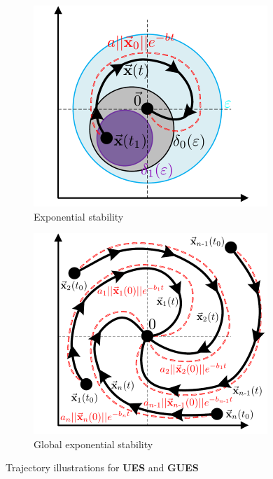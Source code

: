 \begin{figure}[hbtp]
\centering
\begin{subfigure}{0.49\textwidth}
\includegraphics[width=\textwidth]{figs/exponential-stability}
\vspace{-14pt}
\caption{Exponential stability}
\label{fig:exponential-stability}
\end{subfigure}
\begin{subfigure}{0.49\textwidth}
\centering
\includegraphics[width=\textwidth]{figs/global-exponential-stability}
\vspace{-14pt}
\caption{Global exponential stability}
\label{fig:global-exponential-stability}
\end{subfigure}
\vspace{-4pt}
\caption{Trajectory illustrations for \textbf{UES} and \textbf{GUES}}
\vspace{-14pt}
\end{figure}
